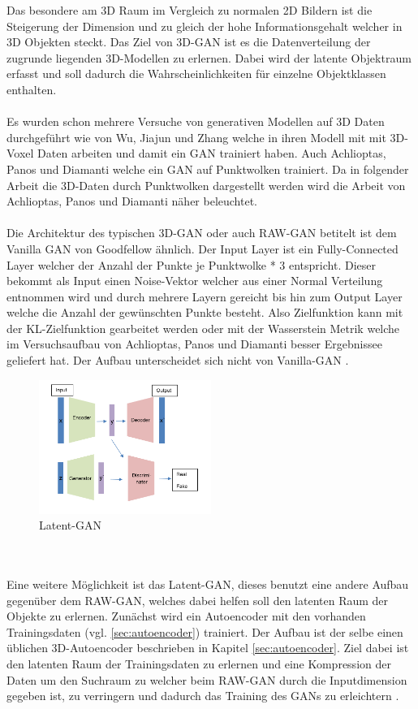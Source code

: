 \documentclass{llncs}
\begin{document}
Das besondere am 3D Raum im Vergleich zu normalen 2D Bildern ist die Steigerung der Dimension und zu gleich der hohe Informationsgehalt welcher in 3D Objekten steckt. Das Ziel von 3D-GAN ist es die Datenverteilung der zugrunde liegenden 3D-Modellen zu erlernen. Dabei wird der latente Objektraum erfasst und soll dadurch die Wahrscheinlichkeiten für einzelne Objektklassen enthalten. 
\\\\
Es wurden schon mehrere Versuche von generativen Modellen auf 3D Daten durchgeführt wie von Wu, Jiajun und Zhang \cite{3d} welche in ihren Modell mit mit 3D-Voxel Daten arbeiten und damit ein GAN trainiert haben. Auch Achlioptas, Panos und Diamanti\cite{3dgan} welche ein GAN auf Punktwolken trainiert. Da in folgender Arbeit die 3D-Daten durch Punktwolken dargestellt werden wird die Arbeit von Achlioptas, Panos und Diamanti näher beleuchtet.
\\\\
Die Architektur des typischen 3D-GAN oder auch RAW-GAN betitelt ist dem Vanilla GAN von Goodfellow ähnlich. Der Input Layer ist ein Fully-Connected Layer welcher der Anzahl der Punkte je Punktwolke * 3 entspricht. Dieser bekommt als Input einen Noise-Vektor welcher aus einer Normal Verteilung entnommen wird und durch mehrere Layern gereicht bis hin zum Output Layer welche die Anzahl der gewünschten Punkte besteht. Also Zielfunktion kann mit der KL-Zielfunktion gearbeitet werden oder mit der Wasserstein Metrik welche im Versuchsaufbau von Achlioptas, Panos und Diamanti besser Ergebnissee geliefert hat. Der Aufbau unterscheidet sich nicht von Vanilla-GAN \cite{3dgan}. 
\begin{figure}[htbp] 
	\centering
	\includegraphics[width=0.5\textwidth]{latentgan.png}
	\caption{Latent-GAN}
	\label{fig:Bild39}
\end{figure}
~\\\\
Eine weitere Möglichkeit ist das Latent-GAN, dieses benutzt eine andere Aufbau gegenüber dem RAW-GAN, welches dabei helfen soll den latenten Raum der Objekte zu erlernen. Zunächst wird ein Autoencoder mit den vorhanden Trainingsdaten (vgl. \ref{sec:autoencoder}) trainiert. Der Aufbau ist der selbe einen üblichen 3D-Autoencoder beschrieben in Kapitel \ref{sec:autoencoder}. Ziel dabei ist den latenten Raum der Trainingsdaten zu erlernen und eine Kompression der Daten um den Suchraum zu  welcher beim RAW-GAN durch die Inputdimension gegeben ist, zu verringern und dadurch das Training des GANs zu erleichtern \cite{3dgan}. 
\end{document}
